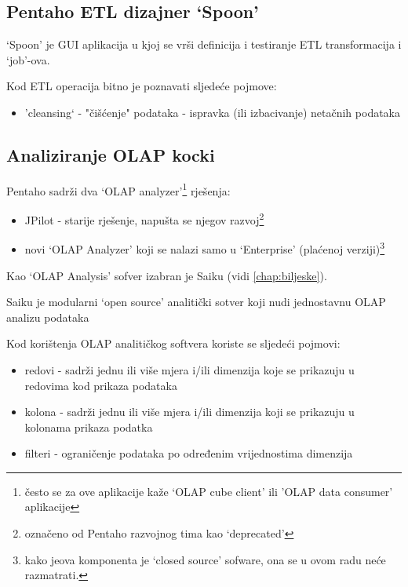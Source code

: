 \documentclass[times, utf8, seminar]{fit}
\begin{document}
\subsection{Pentaho ETL dizajner `Spoon'}

`Spoon' je GUI aplikacija u kjoj se vrši definicija i testiranje ETL transformacija i `job'-ova.

Kod ETL operacija bitno je poznavati sljedeće pojmove:

\begin{itemize}
  \item 'cleansing` - "čišćenje" podataka - ispravka (ili izbacivanje) netačnih podataka
\end{itemize}

\subsection{Analiziranje OLAP kocki}

Pentaho sadrži dva `OLAP analyzer'\footnote{često se za ove aplikacije kaže `OLAP cube client' ili 'OLAP data consumer' aplikacije} rješenja:

\begin{itemize}
  \item JPilot - starije rješenje, napušta se njegov razvoj\footnote{označeno od Pentaho razvojnog tima kao `deprecated'}
  \item novi `OLAP Analyzer' koji se nalazi samo u `Enterprise' (plaćenoj verziji)\footnote{kako jeova komponenta je `closed source' sofware, ona se u ovom radu neće razmatrati.}
\end{itemize}

Kao `OLAP Analysis' sofver izabran je Saiku (vidi \ref{chap:biljeske}).

Saiku je modularni `open source' analitički sotver koji nudi jednostavnu OLAP analizu podataka \cite{web:saiku}

Kod korištenja OLAP analitičkog softvera koriste se sljedeći pojmovi:

\begin{itemize}
  \item redovi - sadrži jednu ili više mjera i/ili dimenzija koje se prikazuju u redovima kod prikaza podataka
  \item kolona - sadrži jednu ili više mjera i/ili dimenzija koji se prikazuju u kolonama prikaza podatka
  \item filteri - ograničenje podataka po određenim vrijednostima dimenzija
\end{itemize}
\end{document}
